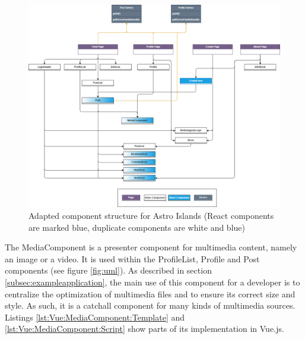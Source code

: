\documentclass[a4paper, 12pt]{article}
\begin{document}
\begin{figure}
  \begin{center}
    \includegraphics[width=\linewidth]{diagrams/uml-astro.png}
  \end{center}
  \caption{Adapted component structure for Astro Islands (React components are marked blue, duplicate components are white and blue)}\label{fig:astroUml}
\end{figure}

The MediaComponent is a presenter component for multimedia content, namely an image or a video.
It is used within the ProfileList, Profile and Post components (see figure \ref{fig:uml}).
As described in section \ref{subsec:exampleapplication}, the main use of this component for a developer is to centralize the optimization of multimedia files and to ensure its correct size and style.
As such, it is a catchall component for many kinds of multimedia sources. Listings \ref{lst:Vue:MediaComponent:Template} and \ref{lst:Vue:MediaComponent:Script} show parts of its implementation in Vue.js.
\end{document}
